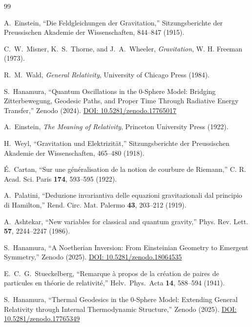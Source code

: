 \documentclass[%
 reprint,
 amsmath,amssymb,
 aps,
 prb,
]{revtex4-2}
\numberwithin{equation}{section}
\begin{document}
\begin{thebibliography}{99}

A.~Einstein,
``Die Feldgleichungen der Gravitation,''
Sitzungsberichte der Preussischen Akademie der Wissenschaften, 844--847 (1915).

C.~W.~Misner, K.~S.~Thorne, and J.~A.~Wheeler,
\textit{Gravitation},
W. H. Freeman (1973).

R.~M.~Wald,
\textit{General Relativity},
University of Chicago Press (1984).

S.~Hanamura,
``Quantum Oscillations in the 0-Sphere Model: Bridging Zitterbewegung, Geodesic Paths, and Proper Time Through Radiative Energy Transfer,''
Zenodo (2024).
\href{https://doi.org/10.5281/zenodo.17765017}{DOI: 10.5281/zenodo.17765017}

A.~Einstein,
\textit{The Meaning of Relativity},
Princeton University Press (1922).

H.~Weyl,
``Gravitation und Elektrizit{\"a}t,''
Sitzungsberichte der Preussischen Akademie der Wissenschaften, 465--480 (1918).

{\'E}.~Cartan,
``Sur une g{\'e}n{\'e}ralisation de la notion de courbure de Riemann,''
C. R. Acad. Sci. Paris \textbf{174}, 593--595 (1922).

A.~Palatini,
``Deduzione invariantiva delle equazioni gravitazionali dal principio di Hamilton,''
Rend. Circ. Mat. Palermo \textbf{43}, 203--212 (1919).

A.~Ashtekar,
``New variables for classical and quantum gravity,''
Phys. Rev. Lett. \textbf{57}, 2244--2247 (1986).

S.~Hanamura,
``A Noetherian Inversion: From Einsteinian Geometry to Emergent Symmetry,''
Zenodo (2025).
\href{https://doi.org/10.5281/zenodo.18064535}{DOI: 10.5281/zenodo.18064535}

E.~C.~G.~Stueckelberg,
``Remarque {\`a} propos de la cr{\'e}ation de paires de particules en th{\'e}orie de relativit{\'e},''
Helv.\ Phys.\ Acta {\bf 14}, 588--594 (1941).

S.~Hanamura,
``Thermal Geodesics in the 0-Sphere Model: Extending General Relativity through Internal Thermodynamic Structure,''
Zenodo (2025).
\href{https://doi.org/10.5281/zenodo.17765349}{DOI: 10.5281/zenodo.17765349}


\end{thebibliography}
\end{document}
